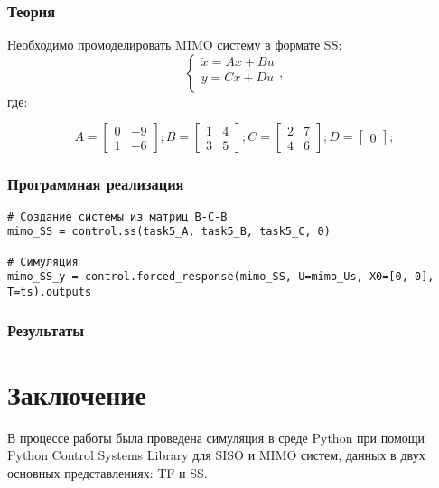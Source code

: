 \documentclass[16pt]{article}
\begin{document}
\subsubsection{Теория}
Необходимо промоделировать MIMO систему в формате SS:
\[ 
    \begin{cases}
        \dot{x} = Ax + Bu \\
        y = Cx + Du \\
    \end{cases},
\]
где:

\[ 
    A = \begin{bmatrix}
        0 &  -9 \\
        1 &  -6 
        \end{bmatrix};
        B = \begin{bmatrix}
            1 & 4 \\
            3 & 5
            \end{bmatrix};
        C = \begin{bmatrix}
            2 & 7 \\
            4 & 6
            \end{bmatrix};
        D = \begin{bmatrix}
            0
            \end{bmatrix};
\]

\subsubsection{Программная реализация}
\begin{verbatim}
# Создание системы из матриц В-С-В
mimo_SS = control.ss(task5_A, task5_B, task5_C, 0)

# Симуляция
mimo_SS_y = control.forced_response(mimo_SS, U=mimo_Us, X0=[0, 0], T=ts).outputs
\end{verbatim}

\subsubsection{Результаты}


\newpage
\section{Заключение}
В процессе работы была проведена симуляция в среде Python при помощи Python Control Systems Library для SISO и MIMO систем, данных в двух основных представлениях: TF и SS.
\end{document}
